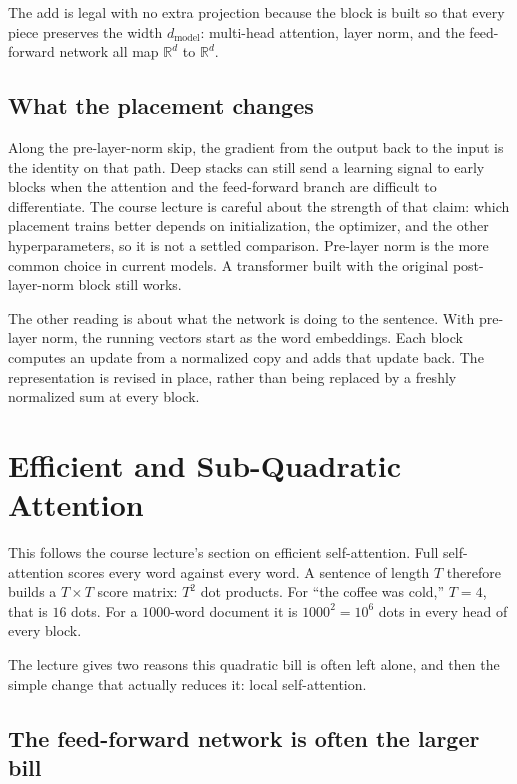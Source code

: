 \documentclass[11pt]{article}
\begin{document}
The add is legal with no extra projection because the block is built so
that every piece preserves the width \(d_{\text{model}}\): multi-head
attention, layer norm, and the feed-forward network all map
\(\mathbb{R}^{d}\) to \(\mathbb{R}^{d}\).

\subsection{What the placement changes}

Along the pre-layer-norm skip, the gradient from the output back to the
input is the identity on that path. Deep stacks can still send a learning
signal to early blocks when the attention and the feed-forward branch are
difficult to differentiate. The course lecture is careful about the
strength of that claim: which placement trains better depends on
initialization, the optimizer, and the other hyperparameters, so it is not
a settled comparison. Pre-layer norm is the more common choice in current
models. A transformer built with the original post-layer-norm block still
works.

The other reading is about what the network is doing to the sentence. With
pre-layer norm, the running vectors start as the word embeddings. Each
block computes an update from a normalized copy and adds that update back.
The representation is revised in place, rather than being replaced by a
freshly normalized sum at every block.

\section{Efficient and Sub-Quadratic Attention}
\label{sec:subquadratic}

This follows the course lecture's section on efficient self-attention.
Full self-attention scores every word against every word. A sentence of
length \(T\) therefore builds a \(T\times T\) score matrix: \(T^2\) dot
products. For ``the coffee was cold,'' \(T=4\), that is \(16\) dots. For a
\(1000\)-word document it is \(1000^2 = 10^6\) dots in every head of every
block.

The lecture gives two reasons this quadratic bill is often left alone, and
then the simple change that actually reduces it: local self-attention.

\subsection{The feed-forward network is often the larger bill}
\end{document}
